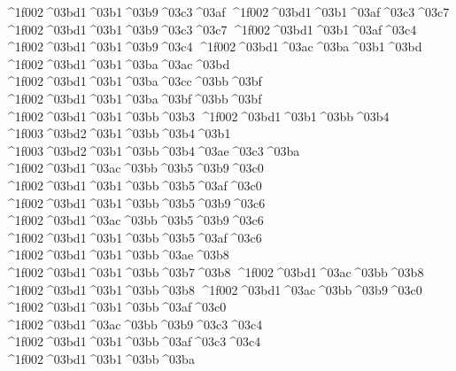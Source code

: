 {^^^^1f002^^^^03bd1^^^^03b1^^^^03b9^^^^03c3^^^^03af
^^^^1f002^^^^03bd1^^^^03b1^^^^03af^^^^03c3^^^^03c7  		%
^^^^1f002^^^^03bd1^^^^03b1^^^^03b9^^^^03c3^^^^03c7
^^^^1f002^^^^03bd1^^^^03b1^^^^03af^^^^03c4 		%
^^^^1f002^^^^03bd1^^^^03b1^^^^03b9^^^^03c4
^^^^1f002^^^^03bd1^^^^03ac^^^^03ba^^^^03b1^^^^03bd 		%
^^^^1f002^^^^03bd1^^^^03b1^^^^03ba^^^^03ac^^^^03bd
^^^^1f002^^^^03bd1^^^^03b1^^^^03ba^^^^03cc^^^^03bb^^^^03bf 		%
^^^^1f002^^^^03bd1^^^^03b1^^^^03ba^^^^03bf^^^^03bb^^^^03bf
^^^^1f002^^^^03bd1^^^^03b1^^^^03bb^^^^03b3  		%
^^^^1f002^^^^03bd1^^^^03b1^^^^03bb^^^^03b4  		%
	^^^^1f003^^^^03bd2^^^^03b1^^^^03bb^^^^03b4^^^^03b1 		%
	^^^^1f003^^^^03bd2^^^^03b1^^^^03bb^^^^03b4^^^^03ae^^^^03c3^^^^03ba 		%
^^^^1f002^^^^03bd1^^^^03ac^^^^03bb^^^^03b5^^^^03b9^^^^03c0		%
^^^^1f002^^^^03bd1^^^^03b1^^^^03bb^^^^03b5^^^^03af^^^^03c0
^^^^1f002^^^^03bd1^^^^03b1^^^^03bb^^^^03b5^^^^03b9^^^^03c6 		%
^^^^1f002^^^^03bd1^^^^03ac^^^^03bb^^^^03b5^^^^03b9^^^^03c6 		%
^^^^1f002^^^^03bd1^^^^03b1^^^^03bb^^^^03b5^^^^03af^^^^03c6
^^^^1f002^^^^03bd1^^^^03b1^^^^03bb^^^^03ae^^^^03b8 		%
^^^^1f002^^^^03bd1^^^^03b1^^^^03bb^^^^03b7^^^^03b8
^^^^1f002^^^^03bd1^^^^03ac^^^^03bb^^^^03b8 		%
^^^^1f002^^^^03bd1^^^^03b1^^^^03bb^^^^03b8
^^^^1f002^^^^03bd1^^^^03ac^^^^03bb^^^^03b9^^^^03c0 		%
^^^^1f002^^^^03bd1^^^^03b1^^^^03bb^^^^03af^^^^03c0
^^^^1f002^^^^03bd1^^^^03ac^^^^03bb^^^^03b9^^^^03c3^^^^03c4 		%
^^^^1f002^^^^03bd1^^^^03b1^^^^03bb^^^^03af^^^^03c3^^^^03c4
^^^^1f002^^^^03bd1^^^^03b1^^^^03bb^^^^03ba  		%
}

